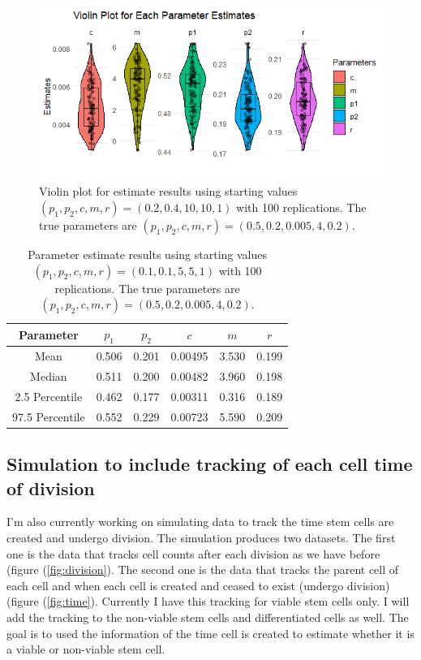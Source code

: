 \documentclass[11pt]{article}
\begin{document}
\begin{figure}[!ht]
    \centering
    \includegraphics[width=0.75\linewidth]{start02_05020005402.png}
    \caption{Violin plot for estimate results using starting values $(p_1, p_2, c, m,r) = (0.2, 0.4, 10, 10, 1)$ with 100 replications. The true parameters are $(p_1, p_2, c, m,r) = (0.5, 0.2, 0.005, 4, 0.2)$.}
    \label{fig:start02}
\end{figure}
\begin{table}[!ht]
    \centering
    \begin{tabular}{|c|c|c|c|c|c|}
    \hline
         Parameter& $p_1$ & $p_2$ &$c$  & $m$ & $r$\\
         \hline
         Mean &  0.506 & 0.201 & 0.00495 & 3.530 & 0.199\\
         Median& 0.511 & 0.200 & 0.00482 & 3.960 & 0.198 \\
         2.5 Percentile& 0.462 & 0.177 & 0.00311 & 0.316 & 0.189 \\
         97.5 Percentile& 0.552 & 0.229 & 0.00723 & 5.590 & 0.209\\
         \hline
    \end{tabular}
    \caption{Parameter estimate results using starting values $(p_1, p_2, c, m,r) = (0.1, 0.1, 5, 5, 1)$ with 100 replications. The true parameters are $(p_1, p_2, c, m,r) = (0.5, 0.2, 0.005, 4, 0.2)$.}
    \label{tab:start02}
\end{table}

\subsection*{Simulation to include tracking of each cell time of division}
I'm also currently working on simulating data to track the time stem cells are created and undergo division. The simulation produces two datasets. The first one is the data that tracks cell counts after each division as we have before (figure (\ref{fig:division}). The second one is the data that tracks the parent cell of each cell and when each cell is created and ceased to exist (undergo division) (figure (\ref{fig:time}). Currently I have this tracking for viable stem cells only. I will add the tracking to the non-viable stem cells and differentiated cells as well. The goal is to used the information of the time cell is created to estimate whether it is a viable or non-viable stem cell.
\end{document}
